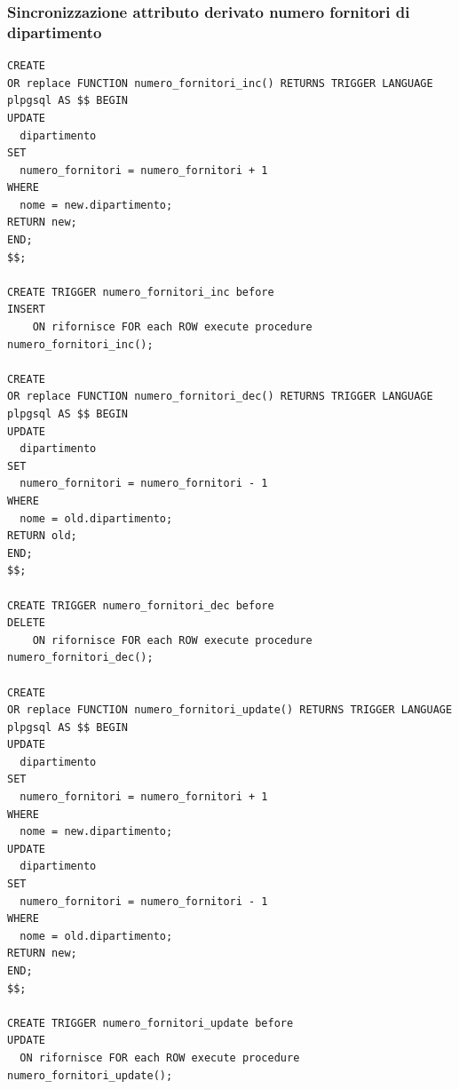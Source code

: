 \documentclass{article}
\begin{document}
\newpage

\subsubsection{Sincronizzazione attributo derivato numero fornitori di dipartimento}
\begin{verbatim}
CREATE 
OR replace FUNCTION numero_fornitori_inc() RETURNS TRIGGER LANGUAGE plpgsql AS $$ BEGIN 
UPDATE 
  dipartimento 
SET 
  numero_fornitori = numero_fornitori + 1 
WHERE 
  nome = new.dipartimento;
RETURN new;
END;
$$;

CREATE TRIGGER numero_fornitori_inc before 
INSERT 
    ON rifornisce FOR each ROW execute procedure numero_fornitori_inc();

CREATE 
OR replace FUNCTION numero_fornitori_dec() RETURNS TRIGGER LANGUAGE plpgsql AS $$ BEGIN 
UPDATE 
  dipartimento 
SET 
  numero_fornitori = numero_fornitori - 1 
WHERE 
  nome = old.dipartimento;
RETURN old;
END;
$$;

CREATE TRIGGER numero_fornitori_dec before 
DELETE 
    ON rifornisce FOR each ROW execute procedure numero_fornitori_dec();

CREATE 
OR replace FUNCTION numero_fornitori_update() RETURNS TRIGGER LANGUAGE plpgsql AS $$ BEGIN 
UPDATE 
  dipartimento 
SET 
  numero_fornitori = numero_fornitori + 1 
WHERE 
  nome = new.dipartimento;
UPDATE 
  dipartimento 
SET 
  numero_fornitori = numero_fornitori - 1 
WHERE 
  nome = old.dipartimento;
RETURN new;
END;
$$;

CREATE TRIGGER numero_fornitori_update before 
UPDATE 
  ON rifornisce FOR each ROW execute procedure numero_fornitori_update();
\end{verbatim}

\newpage
\end{document}
